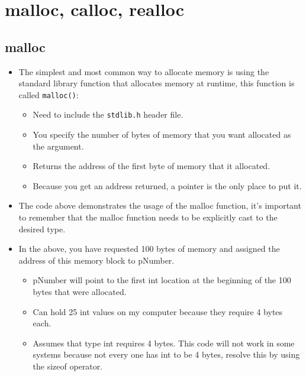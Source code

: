 \section{malloc, calloc, realloc}

\subsection{malloc}
\begin{itemize}
    \item The simplest and most common way to allocate memory is using the standard library function that allocates memory at runtime, this function is called \texttt{malloc()}:
        \begin{itemize}
            \item Need to include the \texttt{stdlib.h} header file. 
            \item You specify the number of bytes of memory that you want allocated as the argument. 
            \item Returns the address of the first byte of memory that it allocated. 
            \item Because you get an address returned, a pointer is the only place to put it. 
        \end{itemize}

    \item The code above demonstrates the usage of the malloc function, it's important to remember that the malloc function needs to be explicitly cast to the desired type.
    \item In the above, you have requested 100 bytes of memory and assigned the address of this memory block to pNumber. 
        \begin{itemize}
            \item pNumber will point to the first int location at the beginning of the 100 bytes that were allocated.
            \item Can hold 25 int values on my computer because they require 4 bytes each. 
            \item Assumes that type int requires 4 bytes. This code will not work in some systems because not every one has int to be 4 bytes, resolve this by using the sizeof operator. 
        \end{itemize}
    

\end{itemize}
